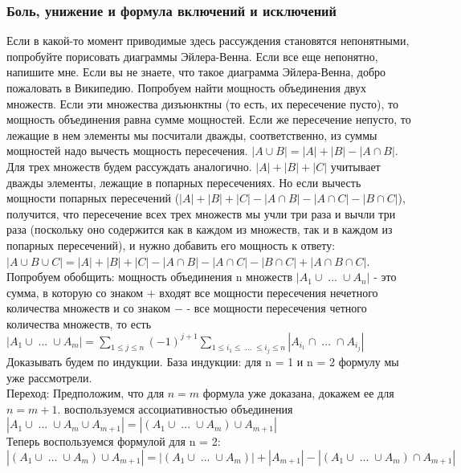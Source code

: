 \subsubsection{Боль, унижение и формула включений и исключений}
Если в какой-то момент приводимые здесь рассуждения становятся непонятными, попробуйте порисовать диаграммы Эйлера-Венна. Если все еще непонятно, напишите мне. Если вы не знаете, что такое диаграмма Эйлера-Венна, добро пожаловать в Википедию.
Попробуем найти мощность объединения двух множеств. Если эти множества дизъюнктны (то есть, их пересечение пусто), то мощность объединения равна сумме мощностей. Если же пересечение непусто, то лежащие в нем элементы мы посчитали дважды, соответственно, из суммы мощностей надо вычесть мощность пересечения. $|A \cup B| = |A| + |B| - |A \cap B|$.\\
Для трех множеств будем рассуждать аналогично. $|A| + |B| + |C|$ учитывает дважды элементы, лежащие в попарных пересечениях. Но если вычесть мощности попарных пересечений ($|A| + |B| + |C| - |A \cap B| - |A \cap C| - |B \cap C|$), получится, что пересечение всех трех множеств мы учли три раза и вычли три раза (поскольку оно содержится как в каждом из множеств, так и в каждом из попарных пересечений), и нужно добавить его мощность к ответу: $|A \cup B \cup C| = |A| + |B| + |C| - |A \cap B| - |A \cap C| - |B \cap C| + |A \cap B \cap C|$. \\
Попробуем обобщить: мощность объединения n множеств $|A_1 \cup \; ... \; \cup A_n|$ - это сумма, в которую со знаком $+$ входят все мощности пересечения нечетного количества множеств и со знаком $-$ - все мощности пересечения четного количества множеств, то есть \\
$|A_1 \cup \; ... \; \cup A_m| = \sum\limits_{1 \leq j \leq n} (-1)^{j + 1} \sum \limits_{1 \leq i_1 \leq \; ... \; \leq i_j \leq n} |A_{i_1} \cap \; ... \; \cap A_{i_j}|$\\
Доказывать будем по индукции. База индукции: для n = 1 и n = 2 формулу мы уже рассмотрели.\\
Переход: Предположим, что для $n = m$ формула уже доказана, докажем ее для $n = m + 1$. воспользуемся ассоциативностью объединения\\
$|A_1 \cup \; ... \; \cup A_m \cup A_{m + 1}| = |(A_1 \cup \; ... \; \cup A_m) \cup A_{m + 1}|$\\
Теперь воспользуемся формулой для n = 2:\\
$|(A_1 \cup \; ... \; \cup A_m) \cup A_{m + 1}| = |(A_1 \cup \; ... \; \cup A_m)| + |A_{m + 1}| - |(A_1 \cup \; ... \; \cup A_m) \cap A_{m + 1}|$\\
